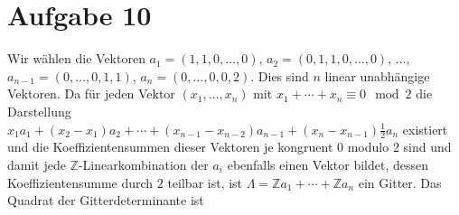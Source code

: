 \section*{Aufgabe 10}
Wir wählen die Vektoren $a_1 = (1, 1, 0, \dots, 0)$, $a_2 = (0, 1, 1, 0, \dots,
0)$, $\dots$, $a_{n-1} = (0, \dots, 0, 1, 1)$, $a_n = (0, \dots, 0, 0, 2)$.
Dies sind $n$ linear unabhängige Vektoren. Da für jeden Vektor $(x_1, \dots,
x_n)$ mit $x_1 + \cdots + x_n \equiv 0\mod 2$ die Darstellung $x_1 a_1 + (x_2 -
x_1) a_2 + \cdots + (x_{n-1} - x_{n-2}) a_{n-1} + (x_n - x_{n-1}) \frac{1}{2}
a_n$ existiert und die Koeffizientensummen dieser Vektoren je kongruent $0$
modulo $2$ sind und damit jede $\mathbb{Z}$-Linearkombination der $a_i$
ebenfalls einen Vektor bildet, dessen Koeffizientensumme durch $2$ teilbar ist,
ist $\Lambda = \mathbb{Z} a_1 + \cdots + \mathbb{Z} a_n$ ein Gitter. Das
Quadrat der Gitterdeterminante ist
